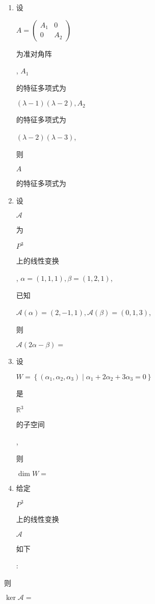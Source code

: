\documentclass[10pt]{article}
\begin{document}
\begin{enumerate}
  \item \begin{CJK}{UTF8}{mj}设\end{CJK} $A=\left(\begin{array}{cc}A_{1} & 0 \\ 0 & A_{2}\end{array}\right)$ \begin{CJK}{UTF8}{mj}为准对角阵\end{CJK}, $A_{1}$ \begin{CJK}{UTF8}{mj}的特征多项式为\end{CJK} $(\lambda-1)(\lambda-2), A_{2}$ \begin{CJK}{UTF8}{mj}的特征多项式为\end{CJK} $(\lambda-2)(\lambda-3)$, \begin{CJK}{UTF8}{mj}则\end{CJK} $A$ \begin{CJK}{UTF8}{mj}的特征多项式为\end{CJK}

  \item \begin{CJK}{UTF8}{mj}设\end{CJK} $\mathscr{A}$ \begin{CJK}{UTF8}{mj}为\end{CJK} $P^{3}$ \begin{CJK}{UTF8}{mj}上的线性变换\end{CJK}, $\alpha=(1,1,1), \beta=(1,2,1)$, \begin{CJK}{UTF8}{mj}已知\end{CJK} $\mathscr{A}(\alpha)=(2,-1,1), \mathscr{A}(\beta)=(0,1,3)$, \begin{CJK}{UTF8}{mj}则\end{CJK} $\mathscr{A}(2 \alpha-\beta)=$

  \item \begin{CJK}{UTF8}{mj}设\end{CJK} $W=\left\{\left(\alpha_{1}, \alpha_{2}, \alpha_{3}\right) \mid \alpha_{1}+2 \alpha_{2}+3 \alpha_{3}=0\right\}$ \begin{CJK}{UTF8}{mj}是\end{CJK} $\mathbb{R}^{3}$ \begin{CJK}{UTF8}{mj}的子空间\end{CJK}, \begin{CJK}{UTF8}{mj}则\end{CJK} $\operatorname{dim} W=$

  \item \begin{CJK}{UTF8}{mj}给定\end{CJK} $P^{3}$ \begin{CJK}{UTF8}{mj}上的线性变换\end{CJK} $\mathscr{A}$ \begin{CJK}{UTF8}{mj}如下\end{CJK}:

\end{enumerate}
\begin{CJK}{UTF8}{mj}则\end{CJK} $\operatorname{ker} \mathscr{A}=$
\end{document}
